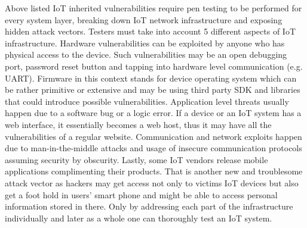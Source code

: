 Above listed IoT inherited vulnerabilities require pen testing to be performed for every system layer, breaking down IoT network infrastructure and exposing hidden attack vectors. Testers must take into account 5 different aspects of IoT infrastructure. Hardware vulnerabilities can be exploited by anyone who has physical access to the device. Such vulnerabilities may be an open debugging port, password reset button and tapping into hardware level communication (e.g. UART)\cite{attify}. Firmware in this context stands for device operating system which can be rather primitive or extensive and may be using third party SDK and libraries that could introduce possible vulnerabilities\cite {cookbook}. Application level threats usually happen due to a software bug or a logic error\cite{cookbook}. If a device or an IoT system has a web interface, it essentially becomes a web host, thus it may have all the vulnerabilities of a regular website\cite{2007:WAH:1406550}. Communication and network exploits happen due to man-in-the-middle attacks and usage of insecure communication protocols assuming security by obscurity. Lastly, some IoT vendors release mobile applications complimenting their products. That is another new and troublesome attack vector as hackers may get access not only to victims IoT devices but also get a foot hold in users' smart phone and might be able to access personal information stored in there\cite{cookbook}. Only by addressing each part of the infrastructure individually and later as a whole one can thoroughly test an IoT system.



